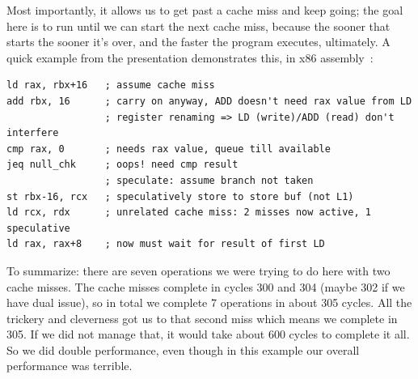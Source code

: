 \documentclass[a4paper]{report}
\begin{document}
Most importantly, it allows us to get past a cache miss and keep going; the goal here is to run until we can start the next cache miss, because the sooner that starts the sooner it's over, and the faster the program executes, ultimately. A quick example from the presentation demonstrates this, in x86 assembly~\cite{modern-hardware}:

\begin{verbatim}
ld rax, rbx+16   ; assume cache miss
add rbx, 16      ; carry on anyway, ADD doesn't need rax value from LD
                 ; register renaming => LD (write)/ADD (read) don't interfere
cmp rax, 0       ; needs rax value, queue till available
jeq null_chk     ; oops! need cmp result
                 ; speculate: assume branch not taken
st rbx-16, rcx   ; speculatively store to store buf (not L1)
ld rcx, rdx      ; unrelated cache miss: 2 misses now active, 1 speculative
ld rax, rax+8    ; now must wait for result of first LD
\end{verbatim}


To summarize: there are seven operations we were trying to do here with two cache misses. The cache misses complete in cycles 300 and 304 (maybe 302 if we have dual issue), so in total we complete 7 operations in about 305 cycles. All the trickery and cleverness got us to that second miss which means we complete in 305. If we did not manage that, it would take about 600 cycles to complete it all. So we did double performance, even though in this example our overall performance was terrible.
 
\end{document}
